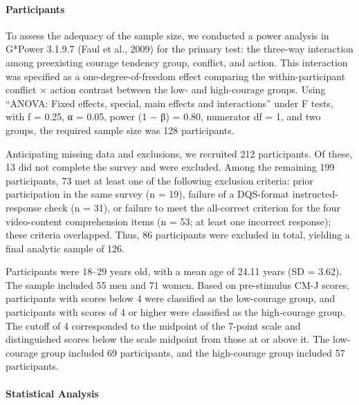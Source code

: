 \paragraph{Participants}\label{participants-1}

To assess the adequacy of the sample size, we conducted a power analysis
in G*Power 3.1.9.7 (Faul et al., 2009) for the primary test: the
three-way interaction among preexisting courage tendency group,
conflict, and action. This interaction was specified as a
one-degree-of-freedom effect comparing the within-participant conflict ×
action contrast between the low- and high-courage groups. Using ``ANOVA:
Fixed effects, special, main effects and interactions'' under F tests,
with f = 0.25, α = 0.05, power (1 − β) = 0.80, numerator df = 1, and two
groups, the required sample size was 128 participants.

Anticipating missing data and exclusions, we recruited 212 participants.
Of these, 13 did not complete the survey and were excluded. Among the
remaining 199 participants, 73 met at least one of the following
exclusion criteria: prior participation in the same survey (n = 19),
failure of a DQS-format instructed-response check (n = 31), or failure
to meet the all-correct criterion for the four video-content
comprehension items (n = 53; at least one incorrect response); these
criteria overlapped. Thus, 86 participants were excluded in total,
yielding a final analytic sample of 126.

Participants were 18--29 years old, with a mean age of 24.11 years (SD =
3.62). The sample included 55 men and 71 women. Based on pre-stimulus
CM-J scores, participants with scores below 4 were classified as the
low-courage group, and participants with scores of 4 or higher were
classified as the high-courage group. The cutoff of 4 corresponded to
the midpoint of the 7-point scale and distinguished scores below the
scale midpoint from those at or above it. The low-courage group included
69 participants, and the high-courage group included 57 participants.

\paragraph{Statistical Analysis}\label{statistical-analysis-1}

